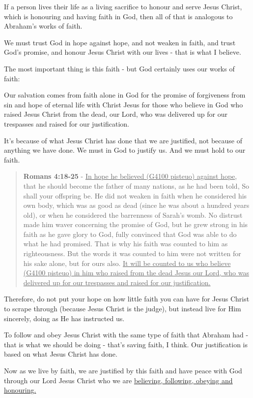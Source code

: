 \documentclass[11pt]{article}
\begin{document}
If a person lives their life as a living sacrifice to honour and serve Jesus Christ, which is honouring and having faith in God, then all of that is analogous to Abraham's works of faith.

We must trust God in hope against hope, and not weaken in faith, and trust God's promise, and honour Jesus Christ with our lives - that is what I believe.

The most important thing is this faith - but God certainly uses our works of faith:

Our salvation comes from faith alone in God for the promise of forgiveness from sin and hope of eternal life with Christ Jesus for those who believe in God who raised Jesus Christ from the dead, our Lord, who was delivered up for our trespasses and raised for our justification.

It's because of what Jesus Christ has done that we are justified, not because of anything we have done. We must in God to justify us. And we must hold to our faith.

\begin{quote}
\textbf{Romans 4:18-25} - \uline{In hope he believed (G4100 pisteuo) against hope}, that he should become the father of many nations, as he had been told, So shall your offspring be. He did not weaken in faith when he considered his own body, which was as good as dead (since he was about a hundred years old), or when he considered the barrenness of Sarah's womb. No distrust made him waver concerning the promise of God, but he grew strong in his faith as he gave glory to God, fully convinced that God was able to do what he had promised. That is why his faith was counted to him as righteousness. But the words it was counted to him were not written for his sake alone, but for ours also. \uline{It will be counted to us who believe (G4100 pisteuo) in him who raised from the dead Jesus our Lord, who was delivered up for our trespasses and raised for our justification.}
\end{quote}

Therefore, do not put your hope on how little faith you can have for Jesus Christ to scrape through (because Jesus Christ is the judge), but instead live for Him sincerely, doing as He has instructed us.

To follow and obey Jesus Christ with the same type of faith that Abraham had - that is what we should be doing - that's saving faith, I think. Our justification is based on what Jesus Christ has done.

Now as we live by faith, we are justified by this faith and have peace with God through our Lord Jesus Christ who we are \uline{believing, following, obeying and honouring.}
\end{document}
